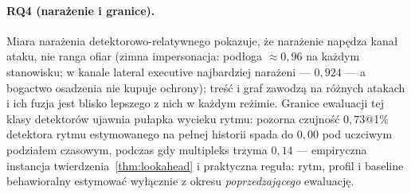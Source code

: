 \paragraph{RQ4 (narażenie i granice).} Miara narażenia
detektorowo-relatywnego pokazuje, że narażenie napędza kanał ataku,
nie ranga ofiar (zimna impersonacja: podłoga $\approx0{,}96$ na
każdym stanowisku; w kanale lateral executive najbardziej narażeni
--- $0{,}924$ --- a bogactwo osadzenia nie kupuje ochrony);
treść i graf zawodzą na różnych atakach i ich fuzja jest blisko
lepszego z nich w każdym reżimie. Granice ewaluacji tej klasy
detektorów ujawnia pułapka wycieku rytmu: pozorna czujność
$0{,}73$@1\% detektora rytmu estymowanego na pełnej historii
spada do $0{,}00$ pod uczciwym podziałem czasowym, podczas gdy
multipleks trzyma $0{,}14$ --- empiryczna instancja
twierdzenia~\ref{thm:lookahead} i praktyczna reguła: rytm, profil
i baseline behawioralny estymować wyłącznie z okresu
\emph{poprzedzającego} ewaluację.

